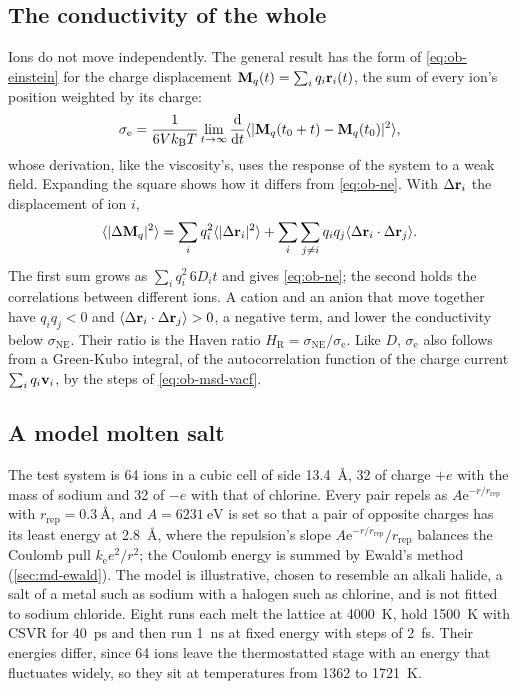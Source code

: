\subsection*{The conductivity of the whole}

Ions do not move independently. The general result has the form of
\cref{eq:ob-einstein} for the charge displacement $\bm{\mathrm{M}}_q(t) =
\sum_iq_i\bm{\mathrm{r}}_i(t)$, the sum of every ion's position weighted by its
charge:
\begin{equation}
   \sigma_{\mathrm e} = \frac{1}{6Vk_{\mathrm{B}} T}\lim_{t\to\infty}\frac{\mathrm{d}}{\mathrm{d} t}
   \langle \lvert\bm{\mathrm{M}}_q(t_0 + t) - \bm{\mathrm{M}}_q(t_0)\rvert^2 \rangle ,
   \label{eq:ob-sigma}
\end{equation}
whose derivation, like the viscosity's, uses the response of the system
to a weak field\cite{AllenTildesley2017}. Expanding the square shows how
it differs from \cref{eq:ob-ne}. With $\Delta\bm{\mathrm{r}}_i$ the displacement of
ion $i$,
\begin{equation*}
   \langle \lvert\Delta\bm{\mathrm{M}}_q\rvert^2 \rangle
   = \sum_iq_i^2\langle \lvert\Delta\bm{\mathrm{r}}_i\rvert^2 \rangle
   + \sum_i\sum_{j\neq i}q_iq_j\langle \Delta\bm{\mathrm{r}}_i\cdot\Delta\bm{\mathrm{r}}_j \rangle .
\end{equation*}
The first sum grows as $\sum_iq_i^2\,6D_it$ and gives
\cref{eq:ob-ne}; the second holds the correlations between different
ions. A cation and an anion that move together have $q_iq_j < 0$ and
$\langle \Delta\bm{\mathrm{r}}_i\cdot\Delta\bm{\mathrm{r}}_j \rangle > 0$, a negative term, and lower
the conductivity below $\sigma_{\mathrm{NE}}$. Their ratio is the Haven
ratio $H_{\mathrm R} = \sigma_{\mathrm{NE}}/\sigma_{\mathrm e}$. Like $D$,
$\sigma_{\mathrm e}$ also follows from a Green-Kubo integral, of the
autocorrelation function of the charge current $\sum_iq_i\bm{\mathrm{v}}_i$, by
the steps of \cref{eq:ob-msd-vacf}.

\subsection*{A model molten salt}

The test system is 64 ions in a cubic cell of side \SI{13.4}{\angstrom},
32 of charge $+e$ with the mass of sodium and 32 of $-e$ with that of
chlorine. Every pair repels as $A\mathrm{e}^{-r/r_{\mathrm{rep}}}$ with
$r_{\mathrm{rep}} = \SI{0.3}{\angstrom}$, and $A = \SI{6231}{\electronvolt}$ is
set so that a pair of opposite charges has its least energy at
\SI{2.8}{\angstrom}, where the repulsion's slope $A\mathrm{e}^{-r/r_{\mathrm
{rep}}}/r_{\mathrm{rep}}$ balances the
Coulomb pull $k_{\mathrm e}e^2/r^2$; the Coulomb energy is summed by Ewald's
method (\cref{sec:md-ewald}). The model is illustrative, chosen to
resemble an alkali halide, a salt of a metal such as sodium with a
halogen such as chlorine, and is not fitted to sodium chloride. Eight
runs each melt the lattice at \SI{4000}{\kelvin}, hold
\SI{1500}{\kelvin} with CSVR for \SI{40}{\pico\second} and then run
\SI{1}{\nano\second} at fixed energy with steps of \SI{2}{\femto\second}.
Their energies differ, since 64 ions leave the thermostatted stage with an
energy that fluctuates widely, so they sit at temperatures from 1362 to
\SI{1721}{\kelvin}.

